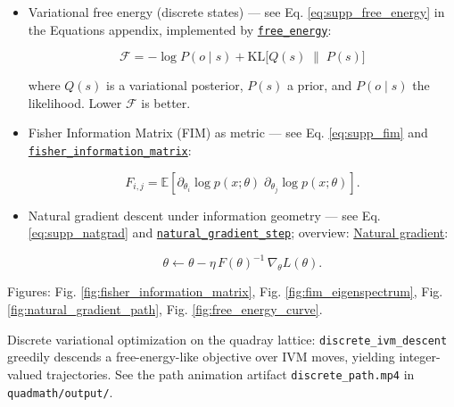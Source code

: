 \documentclass[
]{article}
\begin{document}
\begin{itemize}
\item
  Variational free energy (discrete states) --- see Eq.
  \eqref{eq:supp_free_energy} in the Equations appendix, implemented by
  \href{08_equations_appendix.md\#code:free_energy}{\texttt{free\_energy}}:

  \begin{equation}\label{eq:free_energy_appendix_ref}
  \mathcal{F} = -\log P(o\mid s) + \mathrm{KL}\big[ Q(s)\;\|\; P(s) \big]
  \end{equation}

  where \(Q(s)\) is a variational posterior, \(P(s)\) a prior, and
  \(P(o\mid s)\) the likelihood. Lower \(\mathcal{F}\) is better.
\item
  Fisher Information Matrix (FIM) as metric --- see Eq.
  \eqref{eq:supp_fim} and
  \href{08_equations_appendix.md\#code:fisher_information_matrix}{\texttt{fisher\_information\_matrix}}:

  \begin{equation}\label{eq:fim_definition}
  F_{i,j} = \mathbb{E}\left[ \partial_{\theta_i} \log p(x;\theta)\; \partial_{\theta_j} \log p(x;\theta) \right].
  \end{equation}
\item
  Natural gradient descent under information geometry --- see Eq.
  \eqref{eq:supp_natgrad} and
  \href{08_equations_appendix.md\#code:natural_gradient_step}{\texttt{natural\_gradient\_step}};
  overview:
  \href{https://en.wikipedia.org/wiki/Natural_gradient}{Natural
  gradient}:

  \begin{equation}\label{eq:natural_gradient_update}
  \theta \leftarrow \theta - \eta\, F(\theta)^{-1}\, \nabla_{\theta} L(\theta).
  \end{equation}
\end{itemize}

Figures: Fig. \ref{fig:fisher_information_matrix}, Fig.
\ref{fig:fim_eigenspectrum}, Fig. \ref{fig:natural_gradient_path}, Fig.
\ref{fig:free_energy_curve}.

Discrete variational optimization on the quadray lattice:
\texttt{discrete\_ivm\_descent} greedily descends a free-energy-like
objective over IVM moves, yielding integer-valued trajectories. See the
path animation artifact \texttt{discrete\_path.mp4} in
\texttt{quadmath/output/}.
\end{document}
